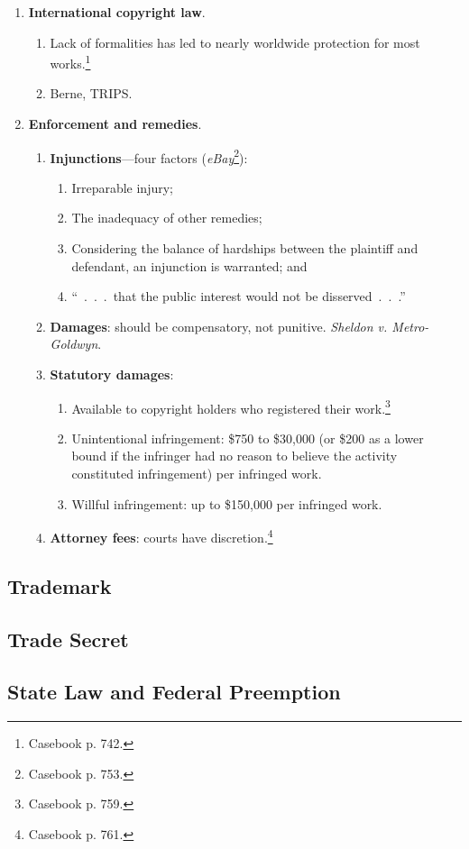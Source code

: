 \begin{enumerate}
\begin{enumerate}
\begin{enumerate}
        \end{enumerate}
    \end{enumerate}
    \item \textbf{International copyright law}.
    \begin{enumerate}
        \item Lack of formalities has led to nearly worldwide protection for 
        most works.\footnote{Casebook p. 742.}
        \item Berne, TRIPS.
    \end{enumerate}
    \item \textbf{Enforcement and remedies}.
    \begin{enumerate}
        \item \textbf{Injunctions}---four factors 
        (\emph{eBay}\footnote{Casebook p. 753.}):
        \begin{enumerate}
            \item Irreparable injury;
            \item The inadequacy of other remedies;
            \item Considering the balance of hardships between the plaintiff 
            and defendant, an injunction is warranted; and
            \item ``~.~.~.~that the public interest would not be 
            disserved~.~.~.''
        \end{enumerate}
        \item \textbf{Damages}: should be compensatory, not punitive.  
        \emph{Sheldon v. Metro-Goldwyn}.
        \item \textbf{Statutory damages}:
        \begin{enumerate}
            \item Available to copyright holders who registered their 
            work.\footnote{Casebook p. 759.}
            \item Unintentional infringement: \$750 to \$30,000 (or \$200 as a 
            lower bound if the infringer had no reason to believe the activity 
            constituted infringement) per infringed work.
            \item Willful infringement: up to \$150,000 per infringed work.
        \end{enumerate}
        \item \textbf{Attorney fees}: courts have 
        discretion.\footnote{Casebook p. 761.}
    \end{enumerate}
\end{enumerate}

\newpage

\subsection{Trademark}


\newpage

\subsection{Trade Secret}


\newpage

\subsection{State Law and Federal Preemption}
